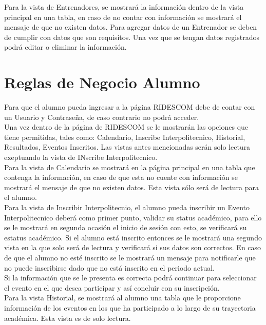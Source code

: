 \noindent Para la vista de Entrenadores, se mostrará la información dentro de la vista principal en una tabla, en caso de no contar con información se mostrará el mensaje de que no existen datos. Para agregar datos de un Entrenador se deben de cumplir con datos que son requisitos. Una vez que se tengan datos registrados podrá editar o eliminar la información. \\

\section{Reglas de Negocio Alumno}
Para que el alumno pueda ingresar a la página RIDESCOM debe de contar con un Usuario y Contraseña, de caso contrario no podrá acceder.\\

Una vez dentro de la página de RIDESCOM se le mostrarán las opciones que tiene permitidas, tales como: Calendario, Inscribe Interpolitecnico, Historial,  Resultados, Eventos Inscritos. Las vistas antes mencionadas serán solo lectura exeptuando la vista de INscribe Interpolitecnico.\\

Para la vista de Calendario se mostrará en la página principal en una tabla que contenga la información, en caso de que esta no cuente con información se mostrará el mensaje de que no existen datos. Esta vista sólo será de lectura para el alumno.\\

Para la vista de Inscribir Interpolitecnio, el alumno pueda inscribir un Evento Interpolitecnico deberá como primer punto, validar su status académico, para ello se le mostrará en segunda ocasión el inicio de sesión con esto, se verificará su estatus académico. Si el alumno está inscrito entonces se le mostrará una segundo vista en la que solo será de lectura y verificará si sus datos son correctos. En caso de que el alumno no esté inscrito se le mostrará un mensaje para notificarle que no puede inscribirse dado que no está inscrito en el periodo actual. \\
Si la información que se le presenta es correcta podrá continuar para seleccionar el evento en el que desea participar y así concluir con su inscripción. \\

Para la vista Historial, se mostrará al alumno una tabla que le proporcione información de los eventos en los que ha participado a lo largo de su trayectoria académica. Esta vista es de solo lectura.\\

